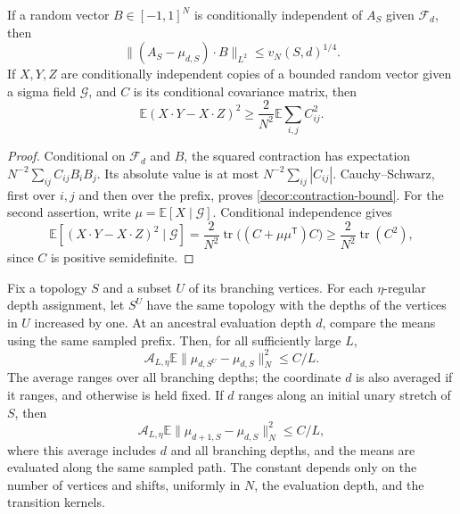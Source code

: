 \begin{lemma}
\label{decor:contractions}
If a random vector $B\in[-1,1]^N$ is conditionally independent of $A_S$
given $\mathscr F_d$, then
\begin{equation}
 \bigl\|(A_S-\mu_{d,S})\cdot B\bigr\|_{L^2}
        \le v_N(S,d)^{1/4}.
 \label{decor:contraction-bound}
\end{equation}
If $X,Y,Z$ are conditionally independent copies of a bounded random
vector given a sigma field $\mathscr G$, and $C$ is its conditional
covariance matrix, then
\begin{equation}
 \mathbb E(X\cdot Y-X\cdot Z)^2
       \ge \frac2{N^2}\mathbb E\sum_{i,j}C_{ij}^2.
 \label{decor:three-copy-bound}
\end{equation}
\end{lemma}

\begin{proof}
Conditional on $\mathscr F_d$ and $B$, the squared contraction has
expectation $N^{-2}\sum_{ij}C_{ij}B_iB_j$.  Its absolute value is at
most $N^{-2}\sum_{ij}|C_{ij}|$.  Cauchy--Schwarz, first over $i,j$
and then over the prefix, proves \eqref{decor:contraction-bound}.
For the second assertion, write $\mu=\mathbb E[X\mid\mathscr G]$.
Conditional independence gives
\[
 \mathbb E[(X\cdot Y-X\cdot Z)^2\mid\mathscr G]
 =\frac2{N^2}\operatorname{tr}\bigl((C+\mu\mu^{\mathsf T})C\bigr)
 \ge\frac2{N^2}\operatorname{tr}(C^2),
\]
since $C$ is positive semidefinite.
\end{proof}

\begin{lemma}
\label{decor:depth-continuity}
Fix a topology $S$ and a subset $U$ of its branching vertices. For each
$\eta$-regular depth assignment, let $S^U$ have the same topology with
the depths of the vertices in $U$ increased by one. At an ancestral
evaluation depth $d$, compare the means using the same sampled prefix.
Then, for all sufficiently large $L$,
\begin{equation}
 \mathcal A_{L,\eta}\mathbb E
       \|\mu_{d,S^U}-\mu_{d,S}\|_N^2\le C/L.
 \label{decor:branch-depth-continuity}
\end{equation}
The average ranges over all branching depths; the coordinate $d$ is
also averaged if it ranges, and otherwise is held fixed. If $d$ ranges
along an initial unary stretch of $S$, then
\begin{equation}
 \mathcal A_{L,\eta}\mathbb E
       \|\mu_{d+1,S}-\mu_{d,S}\|_N^2\le C/L,
 \label{decor:evaluation-depth-continuity}
\end{equation}
where this average includes $d$ and all branching depths, and the means
are evaluated along the same sampled path. The constant depends only on
the number of vertices and shifts, uniformly in $N$, the evaluation
depth, and the transition kernels.
\end{lemma}

